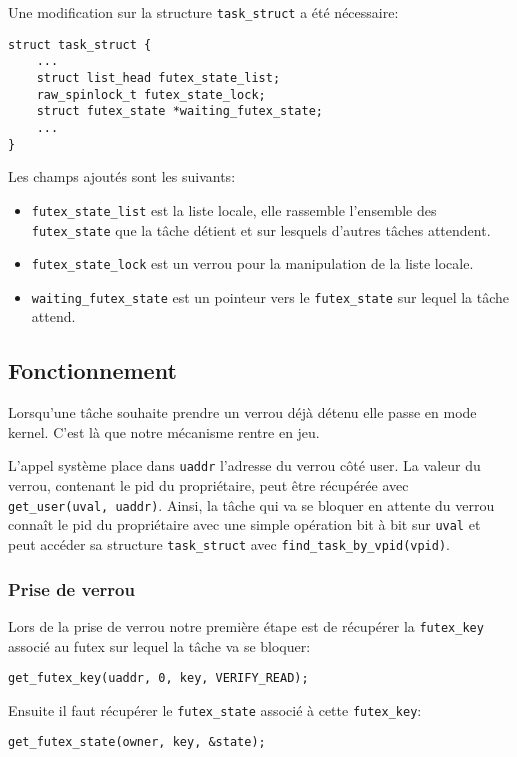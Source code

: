 Une modification sur la structure \verb|task_struct| a été nécessaire:

\begin{lstlisting}[tabsize=4]
struct task_struct {
	...
	struct list_head futex_state_list;
	raw_spinlock_t futex_state_lock;
	struct futex_state *waiting_futex_state;
	...
}
\end{lstlisting}

Les champs ajoutés sont les suivants:
\begin{itemize}
	\item \verb|futex_state_list| est la liste locale, elle rassemble l'ensemble des
	\verb|futex_state| que la tâche détient et sur lesquels d'autres tâches attendent.
	
	\item \verb|futex_state_lock| est un verrou pour la manipulation de la liste locale.
	
	\item \verb|waiting_futex_state| est un pointeur vers le \verb|futex_state| sur lequel
	la tâche attend.
\end{itemize}

\subsection{Fonctionnement}

Lorsqu'une tâche souhaite prendre un verrou déjà détenu elle passe en mode kernel. 
C'est là que notre mécanisme rentre en jeu.

L'appel système place dans \verb|uaddr| l'adresse du verrou côté user. 
La valeur du verrou, contenant le pid du propriétaire, peut être récupérée avec \verb|get_user(uval, uaddr)|.
Ainsi, la tâche qui va se bloquer en attente du verrou connaît le pid du propriétaire avec une simple
opération bit à bit sur \verb|uval| et peut accéder sa structure \verb|task_struct| avec
\verb|find_task_by_vpid(vpid)|.

\subsubsection{Prise de verrou}

Lors de la prise de verrou notre première étape est de récupérer la \verb|futex_key| 
associé au futex sur lequel la tâche va se bloquer:
\begin{lstlisting}[tabsize=4]
	get_futex_key(uaddr, 0, key, VERIFY_READ);
\end{lstlisting}
Ensuite il faut récupérer le \verb|futex_state| associé à cette \verb|futex_key|:
\begin{lstlisting}[tabsize=4]
	get_futex_state(owner, key, &state);
\end{lstlisting}

